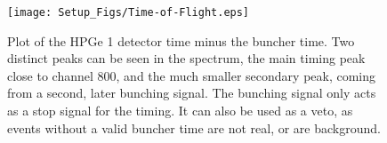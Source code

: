 \begin{figure}[hbt!]
    \centering
    \texttt{[image: Setup\_Figs/Time-of-Flight.eps]}
    \caption{Plot of the HPGe 1 detector time minus the buncher time. Two distinct peaks can be seen in the spectrum, the main timing peak close to channel 800, and the much smaller secondary peak, coming from a second, later bunching signal. The bunching signal only acts as a stop signal for the timing. It can also be used as a veto, as events without a valid buncher time are not real, or are background.}
    \label{fig:bunched}
\end{figure}